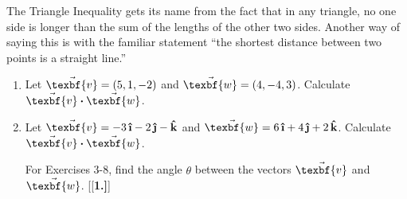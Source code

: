 \piccaption[]{}
\par The Triangle Inequality gets its name from the fact that in any triangle, no one side is longer than the sum of
the lengths of the other two sides. Another way of saying this is with the familiar statement ``the
shortest distance between two points is a straight line.''

\vspace{-1mm}
\startexercises\label{sec1dot3}
\begin{enumerate}[\bfseries 1.]
 \item Let $\vec{\texbf{v}} = (5,1,-2)$ and $\vec{\texbf{w}} = (4,-4,3)$. Calculate $\Dotprod{\vec{\texbf{v}}}{\vec{\texbf{w}}}$.
 \item Let $\vec{\texbf{v}} = -3\,\boldsymbol{\hat{\textbf{\i}}} - 2\,\boldsymbol{\hat{\textbf{\j}}} - \boldsymbol{\hat{\textbf{k}}}$ and
  $\vec{\texbf{w}} = 6\,\boldsymbol{\hat{\textbf{\i}}} + 4\,\boldsymbol{\hat{\textbf{\j}}} + 2\,\boldsymbol{\hat{\textbf{k}}}$. Calculate $\Dotprod{\vec{\texbf{v}}}{\vec{\texbf{w}}}$.
\par\noindent For Exercises 3-8, find the angle $\theta$ between the vectors $\vec{\texbf{v}}$ and $\vec{\texbf{w}}$.
[{[\bfseries 1.]}]

\end{enumerate}
